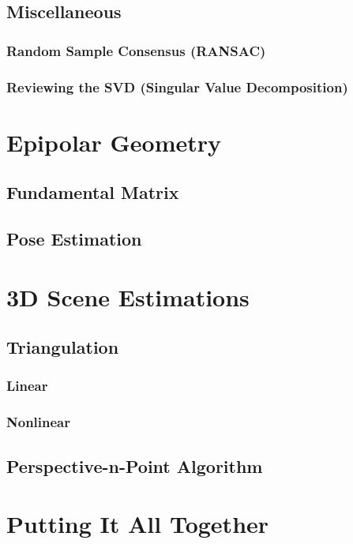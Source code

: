 \documentclass{book}
\begin{document}
        \section{Miscellaneous}
            \subsection{Random Sample Consensus (RANSAC)}
        
            \subsection{Reviewing the SVD (Singular Value Decomposition)}

    \chapter{Epipolar Geometry} 
        \section{Fundamental Matrix}

        \section{Pose Estimation}

    \chapter{3D Scene Estimations}
        \section{Triangulation}
            \subsection{Linear}

            \subsection{Nonlinear}

        \section{Perspective-n-Point Algorithm}

    \chapter{Putting It All Together}
\end{document}
